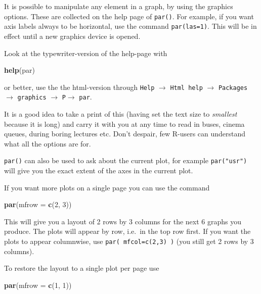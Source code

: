 \documentclass[
]{book}
\newenvironment{Shaded}{\begin{snugshade}}{\end{snugshade}}
\newcommand{\AttributeTok}[1]{\textcolor[rgb]{0.13,0.29,0.53}{#1}}
\newcommand{\DecValTok}[1]{\textcolor[rgb]{0.00,0.00,0.81}{#1}}
\newcommand{\FunctionTok}[1]{\textcolor[rgb]{0.13,0.29,0.53}{\textbf{#1}}}
\newcommand{\NormalTok}[1]{#1}
\begin{document}
It is possible to manipulate any element in a graph, by using the
graphics options. These are collected on the help page of
\texttt{par()}. For example, if you want axis labels always to be
horizontal, use the command \texttt{par(las=1)}. This will be in
effect until a new graphics device is opened.

Look at the typewriter-version of the help-page with

\begin{Shaded}
\begin{Highlighting}[]
\FunctionTok{help}\NormalTok{(par)}
\end{Highlighting}
\end{Shaded}

or better, use the the html-version through
\texttt{Help} \(\rightarrow\) \texttt{Html\ help} \(\rightarrow\)
\texttt{Packages} \(\rightarrow\) \texttt{graphics} \(\rightarrow\)
\texttt{P}\(\rightarrow\) \texttt{par}.

It is a good idea to take a print of this (having set the text
size to \emph{smallest} because it is long) and carry it with you at any
time to read in buses, cinema queues, during boring lectures etc.
Don't despair, few R-users can understand what all the options are
for.

\texttt{par()} can also be used to ask about the current plot, for
example \texttt{par("usr")} will give you the exact extent of the axes
in the current plot.

If you want more plots on a single page you can use the command

\begin{Shaded}
\begin{Highlighting}[]
\FunctionTok{par}\NormalTok{(}\AttributeTok{mfrow =} \FunctionTok{c}\NormalTok{(}\DecValTok{2}\NormalTok{, }\DecValTok{3}\NormalTok{))}
\end{Highlighting}
\end{Shaded}

This will give you a layout of 2 rows by 3 columns for the next 6
graphs you produce. The plots will appear by row, i.e.~in the top
row first. If you want the plots to appear columnwise, use
\texttt{par(\ mfcol=c(2,3)\ )} (you still get 2 rows by 3 columns).

To restore the layout to a single plot per page use

\begin{Shaded}
\begin{Highlighting}[]
\FunctionTok{par}\NormalTok{(}\AttributeTok{mfrow =} \FunctionTok{c}\NormalTok{(}\DecValTok{1}\NormalTok{, }\DecValTok{1}\NormalTok{))}
\end{Highlighting}
\end{Shaded}
\end{document}
